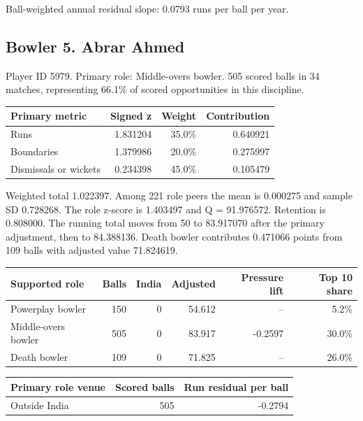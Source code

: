 Ball-weighted annual residual slope: 0.0793 runs per ball per year.

\clearpage

\subsection{Bowler 5. Abrar Ahmed}

Player ID 5979. Primary role: Middle-overs bowler. 505 scored balls in 34 matches, representing 66.1\% of scored opportunities in this discipline.

\begin{center}
\begin{tabularx}{\linewidth}{>{\raggedright\arraybackslash}Xrrr}
\toprule
Primary metric & Signed z & Weight & Contribution \\
\midrule
Runs & 1.831204 & 35.0\% & 0.640921 \\
Boundaries & 1.379986 & 20.0\% & 0.275997 \\
Dismissals or wickets & 0.234398 & 45.0\% & 0.105479 \\
\bottomrule
\end{tabularx}
\end{center}

Weighted total 1.022397. Among 221 role peers the mean is 0.000275 and sample SD 0.728268. The role z-score is 1.403497 and Q = 91.976572. Retention is 0.808000. The running total moves from 50 to 83.917070 after the primary adjustment, then to 84.388136. Death bowler contributes 0.471066 points from 109 balls with adjusted value 71.824619.

\begin{center}
\begin{tabularx}{\linewidth}{>{\raggedright\arraybackslash}Xrrrrr}
\toprule
Supported role & Balls & India & Adjusted & Pressure lift & Top 10 share \\
\midrule
Powerplay bowler & 150 & 0 & 54.612 & -- & 5.2\% \\
Middle-overs bowler & 505 & 0 & 83.917 & -0.2597 & 30.0\% \\
Death bowler & 109 & 0 & 71.825 & -- & 26.0\% \\
\bottomrule
\end{tabularx}
\end{center}

\begin{center}
\begin{tabularx}{\linewidth}{>{\raggedright\arraybackslash}Xrr}
\toprule
Primary role venue & Scored balls & Run residual per ball \\
\midrule
Outside India & 505 & -0.2794 \\
\bottomrule
\end{tabularx}
\end{center}

